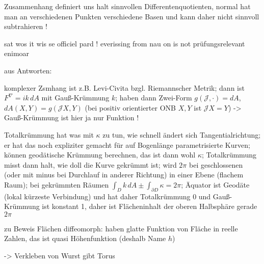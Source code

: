 \documentclass[../H_Analysis_main.tex]{subfiles}
\begin{document}
Zusammenhang definiert uns halt sinnvollen Differentenquotienten, normal hat man an verschiedenen Punkten verschiedene Basen und kann daher nicht sinnvoll subtrahieren !


sat wos it wis se officiel pard ! everissing from nau on is not prüfungsrelevant enimoar




aus Antworten:

komplexer Zsmhang ist z.B. Levi-Civita bzgl. Riemannscher Metrik; dann ist $F^\nabla = i k \, dA$ mit Gauß-Krümmung $k$; haben dann Zwei-Form $g(\mathcal{J}, \cdot) = dA$, $dA(X, Y) = g(\mathcal{J}X, Y)$ (bei positiv orientierter ONB $X, Y$ ist $\mathcal{J}X = Y$) -> Gauß-Krümmung ist hier ja nur Funktion !

Totalkrümmung hat was mit $\kappa$ zu tun, wie schnell ändert sich Tangentialrichtung; er hat das noch expliziter gemacht für auf Bogenlänge parametrisierte Kurven; können geodätische Krümmung berechnen, das ist dann wohl $\kappa$; Totalkrümmung misst dann halt, wie doll die Kurve gekrümmt ist; wird $2\pi$ bei geschlossenen (oder mit minus bei Durchlauf in anderer Richtung) in einer Ebene (flachem Raum); bei gekrümmten Räumen $\int_D k \, dA \pm \int_{\partial D} \kappa = 2\pi$; Äquator ist Geodäte (lokal kürzeste Verbindung) und hat daher Totalkrümmung 0 und Gauß-Krümmung ist konstant 1, daher ist Flächeninhalt der oberen Halbsphäre gerade $2\pi$


zu Beweis Flächen diffeomorph: haben glatte Funktion von Fläche in reelle Zahlen, das ist quasi Höhenfunktion (deshalb Name $h$)


-> Verkleben von Wurst gibt Torus
\end{document}
